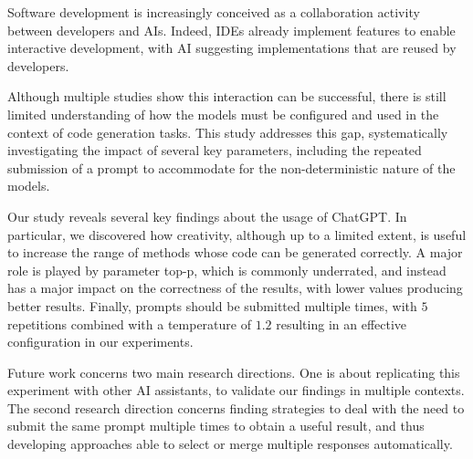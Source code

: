 Software development is increasingly conceived as a collaboration activity between developers and AIs. Indeed, IDEs already implement features to enable interactive development, with AI suggesting implementations that are reused by developers.

Although multiple studies show this interaction can be successful, there is still limited understanding of how the models must be configured and used in the context of code generation tasks. This study addresses this gap, systematically investigating the impact of several key parameters, including the repeated submission of a prompt to accommodate for the non-deterministic nature of the models.

Our study reveals several key findings about the usage of ChatGPT. In particular, we discovered how creativity, although up to a limited extent, is useful to increase the range of methods whose code can be generated correctly. A major role is played by parameter top-p, which is commonly underrated, and instead has a major impact on the correctness of the results, with lower values producing better results. Finally, prompts should be submitted multiple times, with $5$ repetitions combined with a temperature of $1.2$ resulting in an effective configuration in our experiments.  

Future work concerns two main research directions. One is about replicating this experiment with other AI assistants, to validate our findings in multiple contexts. The second research direction concerns finding strategies to deal with the need to submit the same prompt multiple times to obtain a useful result, and thus developing approaches able to select or merge multiple responses automatically. 